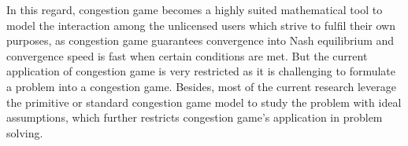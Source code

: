 In this regard, congestion game becomes a highly suited mathematical tool to model the interaction among the unlicensed users which strive to fulfil their own purposes, as congestion game guarantees convergence into Nash equilibrium and convergence speed is fast when certain conditions are met.
But the current application of congestion game is very restricted as it is challenging to formulate a problem into a congestion game.
Besides, most of the current research leverage the primitive or standard congestion game model to study the problem with ideal assumptions, which further restricts congestion game's application in problem solving.

